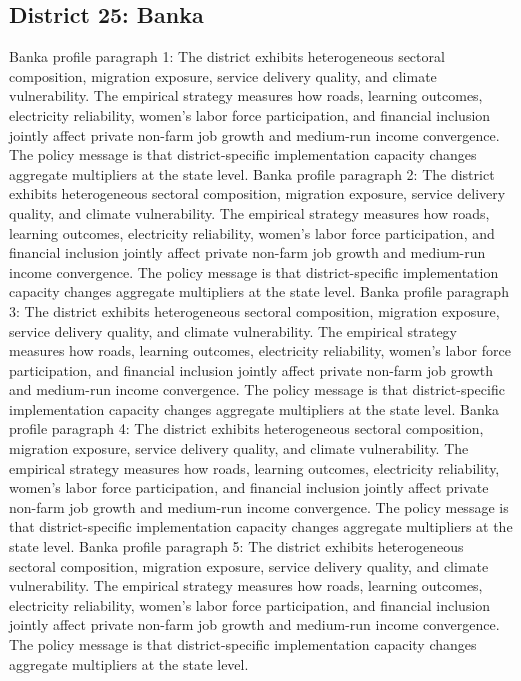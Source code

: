 \documentclass[preprint,12pt]{elsarticle}
\begin{document}
\subsection{District 25: Banka}
Banka profile paragraph 1: The district exhibits heterogeneous sectoral composition, migration exposure, service delivery quality, and climate vulnerability. The empirical strategy measures how roads, learning outcomes, electricity reliability, women's labor force participation, and financial inclusion jointly affect private non-farm job growth and medium-run income convergence. The policy message is that district-specific implementation capacity changes aggregate multipliers at the state level.
Banka profile paragraph 2: The district exhibits heterogeneous sectoral composition, migration exposure, service delivery quality, and climate vulnerability. The empirical strategy measures how roads, learning outcomes, electricity reliability, women's labor force participation, and financial inclusion jointly affect private non-farm job growth and medium-run income convergence. The policy message is that district-specific implementation capacity changes aggregate multipliers at the state level.
Banka profile paragraph 3: The district exhibits heterogeneous sectoral composition, migration exposure, service delivery quality, and climate vulnerability. The empirical strategy measures how roads, learning outcomes, electricity reliability, women's labor force participation, and financial inclusion jointly affect private non-farm job growth and medium-run income convergence. The policy message is that district-specific implementation capacity changes aggregate multipliers at the state level.
Banka profile paragraph 4: The district exhibits heterogeneous sectoral composition, migration exposure, service delivery quality, and climate vulnerability. The empirical strategy measures how roads, learning outcomes, electricity reliability, women's labor force participation, and financial inclusion jointly affect private non-farm job growth and medium-run income convergence. The policy message is that district-specific implementation capacity changes aggregate multipliers at the state level.
Banka profile paragraph 5: The district exhibits heterogeneous sectoral composition, migration exposure, service delivery quality, and climate vulnerability. The empirical strategy measures how roads, learning outcomes, electricity reliability, women's labor force participation, and financial inclusion jointly affect private non-farm job growth and medium-run income convergence. The policy message is that district-specific implementation capacity changes aggregate multipliers at the state level.
\end{document}

